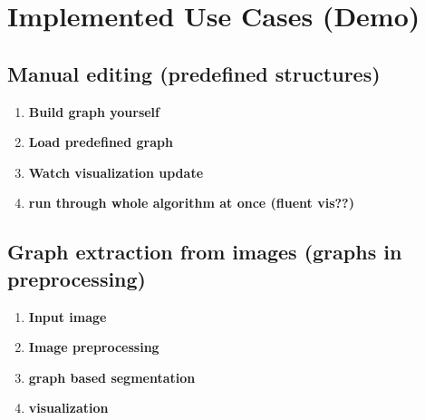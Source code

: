 \chapter{Implemented Use Cases (Demo)}
\label{ch:use_cases}


\section{Manual editing (predefined structures)}
\label{sect:manual_editing}

	\begin{enumerate}
		\item \textbf{Build graph yourself}
		\item \textbf{Load predefined graph}
		\item \textbf{Watch visualization update}
		\item \textbf{run through whole algorithm at once (fluent vis??)}
	\end{enumerate}


\section{Graph extraction from images (graphs in preprocessing)}
\label{sect:graph_ext}

	\begin{enumerate}
		\item \textbf{Input image}
		\item \textbf{Image preprocessing}
		\item \textbf{graph based segmentation}
		\item \textbf{visualization}
	\end{enumerate}
	
